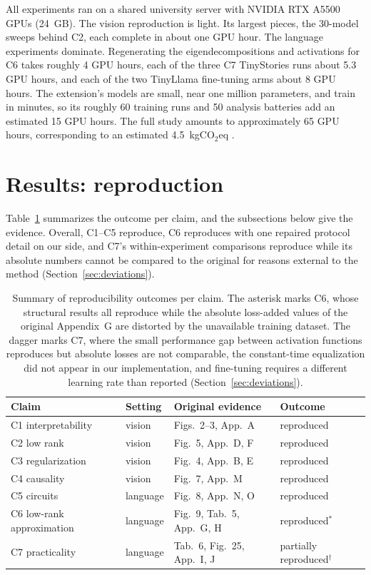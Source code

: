 \documentclass[10pt]{article} %
\begin{document}
All experiments ran on a shared university server with NVIDIA RTX A5500 GPUs (24~GB).
The vision reproduction is light. Its largest pieces, the 30-model sweeps behind C2,
each complete in about one GPU hour. The language experiments dominate.
Regenerating the eigendecompositions and activations for C6 takes roughly 4 GPU
hours, each of the three C7 TinyStories runs about 5.3 GPU hours, and each of the
two TinyLlama fine-tuning arms about 8 GPU hours. The extension's models are small,
near one million parameters, and train in minutes, so its roughly 60 training runs
and 50 analysis batteries add an estimated 15 GPU hours. The full study amounts to
approximately 65 GPU hours, corresponding to an estimated 4.5~kgCO$_2$eq
\citep{lacoste2019quantifying}.

\section{Results: reproduction}
\label{sec:results}

Table~\ref{tab:verdicts} summarizes the outcome per claim, and the subsections below
give the evidence. Overall, C1--C5 reproduce, C6 reproduces with one repaired protocol
detail on our side, and C7's within-experiment comparisons reproduce while its
absolute numbers cannot be compared to the original for reasons external to the
method (Section~\ref{sec:deviations}).

\begin{table}[t]
\begin{center}
\begin{tabular}{llll}
\toprule
Claim & Setting & Original evidence & Outcome \\
\midrule
C1 interpretability & vision & Figs.~2--3, App.~A & reproduced \\
C2 low rank & vision & Fig.~5, App.~D, F & reproduced \\
C3 regularization & vision & Fig.~4, App.~B, E & reproduced \\
C4 causality & vision & Fig.~7, App.~M & reproduced \\
C5 circuits & language & Fig.~8, App.~N, O & reproduced \\
C6 low-rank approximation & language & Fig.~9, Tab.~5, App.~G, H & reproduced$^{*}$ \\
C7 practicality & language & Tab.~6, Fig.~25, App.~I, J & partially reproduced$^{\dagger}$ \\
\bottomrule
\end{tabular}
\end{center}
\caption{Summary of reproducibility outcomes per claim. The asterisk marks C6, whose
structural results all reproduce while the absolute loss-added values of the
original Appendix~G are distorted by the unavailable training dataset. The dagger
marks C7, where the small performance gap between activation functions reproduces
but absolute losses are not comparable, the constant-time equalization did not
appear in our implementation, and fine-tuning requires a different learning rate
than reported (Section~\ref{sec:deviations}).}
\label{tab:verdicts}
\end{table}
\end{document}
